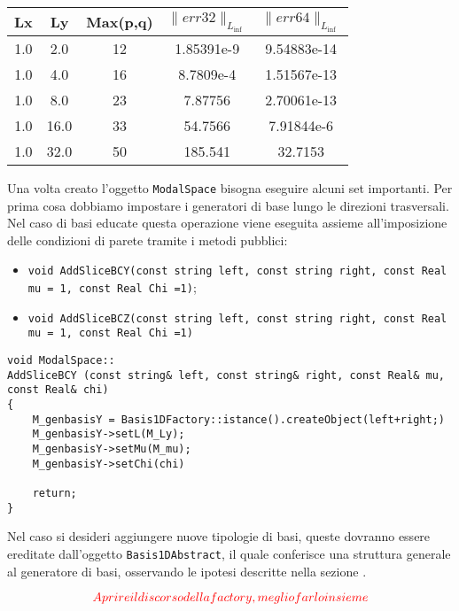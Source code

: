 \begin{center}
\begin{tabular}{|c|c|c|c|c|}
\hline
Lx&Ly & Max(p,q) &  $\parallel err32 \parallel_{L_{\inf}}$ &  $\parallel err64 \parallel_{L_{\inf}}$ \\
\hline
1.0&2.0 & 12 & 1.85391e-9 & 9.54883e-14 \\
\hline
1.0&4.0 & 16 & 8.7809e-4 & 1.51567e-13 \\
\hline
1.0&8.0 & 23 & 7.87756 & 2.70061e-13 \\
\hline
1.0&16.0 & 33 & 54.7566 & 7.91844e-6 \\
\hline
1.0&32.0 & 50 & 185.541 & 32.7153 \\
\hline
\end{tabular}
\end{center}


Una volta creato l'oggetto \texttt{ModalSpace} bisogna eseguire alcuni set importanti. Per prima cosa dobbiamo impostare i generatori di base 
lungo le direzioni trasversali. Nel caso di basi educate questa operazione viene eseguita assieme all'imposizione delle condizioni di parete 
tramite i metodi pubblici:
\begin{itemize}
\item \texttt{void AddSliceBCY(const string left, const string right, const Real mu = 1, const Real Chi =1)};
\item \texttt{void AddSliceBCZ(const string left, const string right, const Real mu = 1, const Real Chi =1)}
\end{itemize}

\begin{lstlisting}[style = general]
void ModalSpace::
AddSliceBCY (const string& left, const string& right, const Real& mu, const Real& chi)
{
	M_genbasisY = Basis1DFactory::istance().createObject(left+right;)
	M_genbasisY->setL(M_Ly);
	M_genbasisY->setMu(M_mu);
	M_genbasisY->setChi(chi)
	
	return;
}
\end{lstlisting}
 Nel caso si desideri aggiungere nuove tipologie di basi, queste dovranno essere ereditate dall'oggetto \texttt{Basis1DAbstract}, il quale 
conferisce una struttura generale al generatore di basi, osservando le ipotesi descritte nella sezione .
 
 \begin{equation}
\textcolor{red}{Aprire il discorso della factory, meglio farlo insieme} 
 \end{equation}

